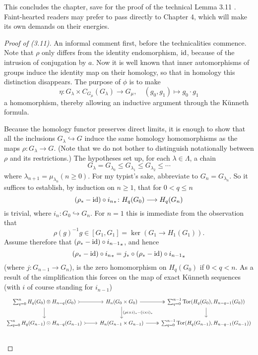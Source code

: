 This concludes the chapter, save for the proof of the technical Lemma 3.11 . Faint-hearted readers may prefer to pass directly to Chapter 4, which will make its own demands on their energies.
\begin{proof}[Proof of (3.11)]
An informal comment first, before the technicalities commence. Note that $\rho$ only differs from the identity endomorphism, $\mathrm{id}$, because of the intrusion of conjugation by $a$. Now it is well known that inner automorphisms of groups induce the identity map on their homology, so that in homology this distinction disappears. The purpose of $\phi$ is to make
\[\eta\colon   G_\lambda \times C_{G_\mu}(G_\lambda) \longrightarrow  G_\mu, \quad (g_0,g_1)\mapsto g_0\cdot g_1\]
a homomorphism, thereby allowing an inductive argument through the K\"{u}nneth formula.

Because the homology functor preserves direct limits, it is enough to show that all the 
inclusions $G_\lambda \hookrightarrow G$ induce the same homology homomorphisms as the maps $\rho\colon   G_\lambda \longrightarrow G$. (Note that we do not bother to distinguish notationally between $\rho$ and its restrictions.) The hypotheses set up, for each $\lambda \in \Lambda$, a chain
\[G_\lambda =G_{\lambda _0}\leqslant G_{\lambda _1}\leqslant G_{\lambda _2}\leqslant \cdots \]
where  $\lambda_{n+1}=\mu_{\lambda_n} (n\geqslant 0)$. For my typist's sake, abbreviate to $G_n= G_{\lambda_n}$. So it suffices to establish, by induction on $n \geqslant 1$, that for $0<q \leqslant n$
 \[(\rho_*-\mathrm{id})\circ {i_n}_*\colon  H_q(G_0)\longrightarrow H_q(G_n)\]
is trivial, where $i_n \colon   G_0 \hookrightarrow G_n$. For $n = 1$ this is immediate from the observation that 
\[\rho(g)^{-1}g\in [G_1, G_1 ] = \ker (G_1 \longrightarrow H_1(G_1)).\]
Assume therefore that $(\rho_*-\mathrm{id})\circ {i_{n-1}}_*$, and hence
\[(\rho_*-\mathrm{id})\circ {i_n}_*=j_* \circ (\rho_*-\mathrm{id})\circ {i_{n-1}}_*\]
(where $j \colon   G_{n-1}\longrightarrow G_n$), is the zero homomorphism on $H_q(G_0)$ if $0<q<n$. As a result of the simplification this forces on the map of exact K\"{u}nneth sequences (with $i$ of course standing for $i_{n-1}$)
\[\begin{tikzcd}
\sum_{q=0}^n H_q(G_0)\otimes H_{n-q}(G_0) \arrow[tail]{r} \arrow{d} &
 H_n(G_0\times G_0) \arrow[two heads]{r} \arrow{d}{(\rho i\times i)_*-(i\times i)_*} &
  \sum_{q=0}^{n-1}\tor (H_q(G_0),H_{n-q-1}(G_0)) \arrow{d}\\
\sum_{q=0}^n H_q(G_{n-1})\otimes H_{n-q}(G_{n-1}) \arrow[tail]{r} &
H_n(G_{n-1}\times G_{n-1}) \arrow[two heads]{r} &
\sum_{q=0}^{n-1}\tor (H_q(G_{n-1}),H_{n-q-1}(G_{n-1})) \\
\end{tikzcd}\]


\end{proof}
